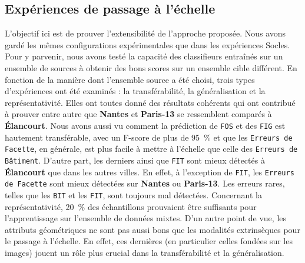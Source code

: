     \subsection*{Expériences de passage à l'échelle}
        L'objectif ici est de prouver l'extensibilité de l'approche proposée.
        Nous avons gardé les mêmes configurations expérimentales que dans les expériences Socles.
        Pour y parvenir, nous avons testé la capacité des classifieurs entraînés sur un ensemble de sources à obtenir des bons scores sur un ensemble cible différent.
        En fonction de la manière dont l'ensemble source a été choisi, trois types d'expériences ont été examinés : la transférabilité, la généralisation et la représentativité.
        Elles ont toutes donné des résultats cohérents qui ont contribué à prouver entre autre que \textbf{Nantes} et \textbf{Paris-13} se ressemblent comparés à \textbf{\'Elancourt}.
        Nous avons aussi vu comment la prédiction de \texttt{FOS} et des \texttt{FIG} est hautement transférable, avec un F-score de plus de \SI[locale=FR]{95}{\percent} et que les \texttt{Erreurs de Facette}, en générale, est plus facile à mettre à l'échelle que celle des \texttt{Erreurs de Bâtiment}.
        D'autre part, les derniers ainsi que \texttt{FIT} sont mieux détectés à \textbf{\'Elancourt} que dans les autres villes.
        En effet, à l'exception de \texttt{FIT}, les \texttt{Erreurs de Facette} sont mieux détectées sur \textbf{Nantes} ou \textbf{Paris-13}.
        Les erreurs rares, telles que les \texttt{BIT} et les \texttt{FIT}, sont toujours mal détectées.
        Concernant la représentativité, \SI[locale=FR]{20}{\percent} des échantillons prouvaient être suffisants pour l'apprentissage sur l'ensemble de données mixtes.
        D'un autre point de vue, les attributs géométriques ne sont pas aussi bons que les modalités extrinsèques pour le passage à l'échelle.
        En effet, ces dernières (en particulier celles fondées sur les images) jouent un rôle plus crucial dans la transférabilité et la généralisation.

